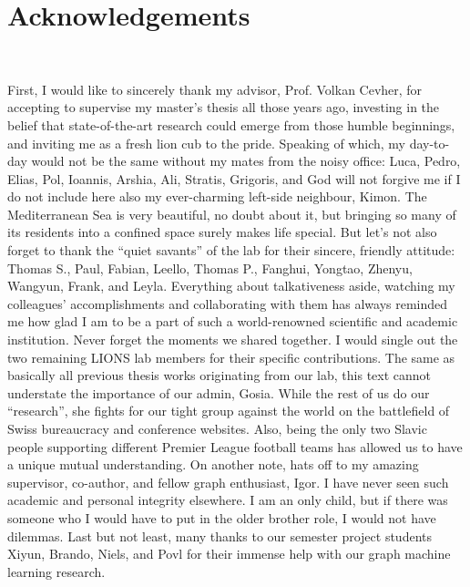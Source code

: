 \chapter*{Acknowledgements}
~\newline~\newline~


First, I would like to sincerely thank my advisor, Prof. Volkan Cevher, for accepting to supervise my master's thesis all those years ago, investing in the belief that state-of-the-art research could emerge from those humble beginnings, and inviting me as a fresh lion cub to the pride. Speaking of which, my day-to-day would not be the same without my mates from the noisy office: Luca, Pedro, Elias, Pol, Ioannis, Arshia, Ali, Stratis, Grigoris, and God will not forgive me if I do not include here also my ever-charming left-side neighbour, Kimon. The Mediterranean Sea is very beautiful, no doubt about it, but bringing so many of its residents into a confined space surely makes life special. But let's not also forget to thank the \enquote{quiet savants} of the lab for their sincere, friendly attitude: Thomas S., Paul, Fabian, Leello, Thomas P., Fanghui, Yongtao, Zhenyu, Wangyun, Frank, and Leyla. Everything about talkativeness aside, watching my colleagues' accomplishments and collaborating with them has always reminded me how glad I am to be a part of such a world-renowned scientific and academic institution. Never forget the moments we shared together. I would single out the two remaining LIONS lab members for their specific contributions. The same as basically all previous thesis works originating from our lab, this text cannot understate the importance of our admin, Gosia. While the rest of us do our \enquote{research}, she fights for our tight group against the world on the battlefield of Swiss bureaucracy and conference websites. Also, being the only two Slavic people supporting different Premier League football teams has allowed us to have a unique mutual understanding. On another note, hats off to my amazing supervisor, co-author, and fellow graph enthusiast, Igor. I have never seen such academic and personal integrity elsewhere. I am an only child, but if there was someone who I would have to put in the older brother role, I would not have dilemmas. Last but not least, many thanks to our semester project students Xiyun, Brando, Niels, and Povl for their immense help with our graph machine learning research.

